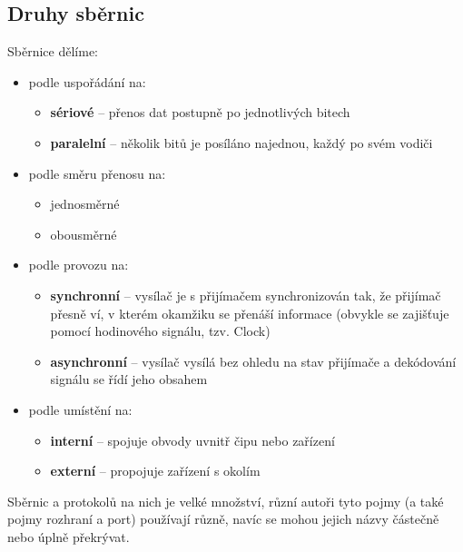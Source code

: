 \documentclass[12pt]{article}
\begin{document}
\subsection{Druhy sběrnic}

Sběrnice dělíme:  
\begin{itemize}

\item podle uspořádání na:
	\begin{itemize}
		\item \textbf{sériové} -- přenos dat postupně po jednotlivých bitech 
		\item \textbf{paralelní} -- několik bitů je posíláno najednou, každý po svém vodiči  
	\end{itemize}

\item podle směru přenosu na: 
	\begin{itemize}
		\item jednosměrné
		\item obousměrné
	\end{itemize}

\item podle provozu na:
	\begin{itemize}
		\item \textbf{synchronní} -- vysílač je s přijímačem synchronizován tak, že přijímač přesně ví, v kterém okamžiku se přenáší informace (obvykle se zajišťuje pomocí hodinového signálu, tzv. Clock) 
		\item \textbf{asynchronní} -- vysílač vysílá bez ohledu na stav přijímače a dekódování signálu se řídí jeho obsahem
	\end{itemize}

\item podle umístění na:
	\begin{itemize}
		\item \textbf{interní} -- spojuje obvody uvnitř čipu nebo zařízení 
		\item \textbf{externí} -- propojuje zařízení s okolím 
	\end{itemize}

\end{itemize}

\vspace{0.5\baselineskip} %
 {\footnotesize Sběrnic a protokolů na nich je velké množství, různí autoři tyto pojmy (a také pojmy rozhraní a port) používají různě, navíc se mohou jejich názvy částečně nebo úplně překrývat. }
\end{document}
